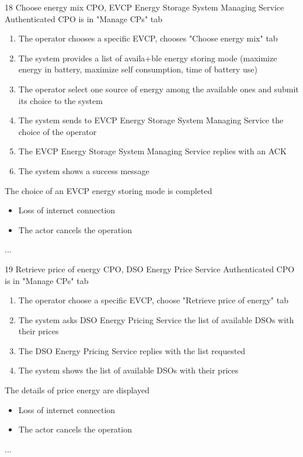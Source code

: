 \usecase
{18}
{Choose energy mix} %
{CPO, EVCP Energy Storage System Managing Service} %
{Authenticated CPO is in "Manage CPs" tab} %
{ %
    \begin{enumerate}
        \item The operator chooses a specific EVCP, chooses "Choose energy mix" tab
        \item The system provides a list of availa+ble energy storing mode (maximize energy in battery, maximize self consumption, time of battery use)
        \item The operator select one source of energy among the available ones and submit its choice to the system
        \item The system sends to EVCP Energy Storage System Managing Service the choice of the operator
        \item The EVCP Energy Storage System Managing Service replies with an ACK
        \item The system shows a success message
    \end{enumerate}
}
{The choice of an EVCP energy storing mode is completed} %
{ %
    \begin{itemize}
        \item Loss of internet connection
        \item The actor cancels the operation
    \end{itemize}
}
{ %
    ...
}

\usecase
{19}
{Retrieve price of energy} %
{CPO, DSO Energy Price Service} %
{Authenticated CPO is in "Manage CPs" tab} %
{ %
    \begin{enumerate}
        \item The operator choose a specific EVCP, choose "Retrieve price of energy" tab
        \item The system asks DSO Energy Pricing Service the list of available DSOs with their prices
        \item The DSO Energy Pricing Service replies with the list requested
        \item The system shows the list of available DSOs with their prices
    \end{enumerate}
}
{The details of price energy are displayed} %
{ %
    \begin{itemize}
        \item Loss of internet connection
        \item The actor cancels the operation
    \end{itemize}
}
{ %
    ...
}

